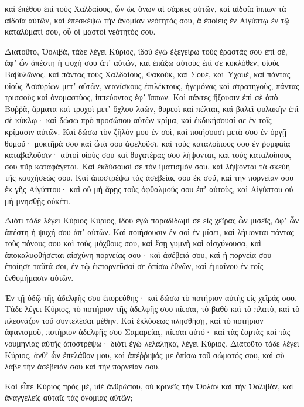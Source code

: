 {καὶ ἐπέθου ἐπὶ τοὺς Χαλδαίους, ὧν ὡς ὄνων αἱ σάρκες αὐτῶν, καὶ αἰδοῖα ἵππων τὰ αἰδοῖα αὐτῶν,
καὶ ἐπεσκέψω τὴν ἀνομίαν νεότητός σου, ἃ ἐποίεις ἐν Αἰγύπτῳ ἐν τῷ καταλύματί σου, οὗ οἱ μαστοὶ νεότητός σου.
\par }{\PP {}Διατοῦτο, Ὀολιβὰ, τάδε λέγει Κύριος, ἰδοὺ ἐγὼ ἐξεγείρω τοὺς ἐραστάς σου ἐπὶ σὲ, ἀφʼ ὧν ἀπέστη ἡ ψυχή σου ἀπʼ αὐτῶν, καὶ ἐπάξω αὐτοὺς ἐπὶ σὲ κυκλόθεν,
υἱοὺς Βαβυλῶνος, καὶ πάντας τοὺς Χαλδαίους, Φακοὺκ, καὶ Σουὲ, καὶ Ὑχουὲ, καὶ πάντας υἱοὺς Ἀσσυρίων μετʼ αὐτῶν, νεανίσκους ἐπιλέκτους, ἡγεμόνας καὶ στρατηγοὺς, πάντας τρισσοὺς καὶ ὀνομαστὺος, ἱππεύοντας ἐφʼ ἵππων.
Καὶ πάντες ἥξουσιν ἐπὶ σὲ ἀπὸ Βοῤῥᾶ, ἅρματα καὶ τροχοὶ μετʼ ὄχλου λαῶν, θυρεοὶ καὶ πέλται, καὶ βαλεῖ φυλακὴν ἐπὶ σὲ κύκλῳ·
καὶ δώσω πρὸ προσώπου αὐτῶν κρίμα, καὶ ἐκδικήσουσί σε ἐν τοῖς κρίμασιν αὐτῶν. Καὶ δώσω τὸν ζῆλόν μου ἐν σοὶ, καὶ ποιήσουσι μετὰ σου ἐν ὀργῇ θυμοῦ· μυκτῆρά σου καὶ ὦτά σου ἀφελοῦσι, καὶ τοὺς καταλοίπους σου ἐν ῥομφαίᾳ καταβαλοῦσιν· αὐτοὶ υἱούς σου καὶ θυγατέρας σου λήψονται, καὶ τοὺς καταλοίπους σου πῦρ καταφάγεται.
Καὶ ἐκδύσουσί σε τὸν ἱματισμόν σου, καὶ λήψονται τὰ σκεύη τῆς καυχήσεώς σου.
Καὶ ἀποστρέψω τὰς ἀσεβείας σου ἐκ σοῦ, καὶ τὴν πορνείαν σου ἐκ γῆς Αἰγύπτου· καὶ οὐ μὴ ἄρῃς τοὺς ὀφθαλμούς σου ἐπʼ αὐτοὺς, καὶ Αἰγύπτου οὐ μὴ μνησθῇς οὐκέτι.
\par }{\PP {}Διότι τάδε λέγει Κύριος Κύριος, ἰδοὺ ἐγὼ παραδίδωμί σε εἰς χεῖρας ὧν μισεῖς, ἀφʼ ὧν ἀπέστη ἡ ψυχή σου ἀπʼ αὐτῶν.
Καὶ ποιήσουσιν ἐν σοὶ ἑν μίσει, καὶ λήψονται πάντας τοὺς πόνους σου καὶ τοὺς μόχθους σου, καὶ ἔσῃ γυμνὴ καὶ αἰσχύνουσα, καὶ ἀποκαλυφθήσεται αἰσχύνη πορνείας σου· καὶ ἀσέβειά σου, καὶ ἡ πορνεία σου
ἐποίησε ταῦτά σοι, ἐν τῷ ἐκπορνεῦσαί σε ὀπίσω ἐθνῶν, καὶ ἐμιαίνου ἐν τοῖς ἐνθυμήμασιν αὐτῶν.
\par }{\PP {}Ἐν τῇ ὁδῷ τῆς ἀδελφῆς σου ἐπορεύθης· καὶ δώσω τὸ ποτήριον αὐτὴς εἰς χεῖράς σου.
Τάδε λέγει Κύριος, τὸ ποτήριον τῆς ἀδελφῆς σου πίεσαι, τὸ βαθὺ καὶ τὸ πλατὺ, καὶ τὸ πλεονάζον τοῦ συντελέσαι μέθην.
Καὶ ἐκλύσεως πλησθήσῃ, καὶ τὸ ποτήριον ἀφανισμοῦ, ποτήριον ἀδελφῆς σου Σαμαρείας, πίεσαι αὐτό·
καὶ τὰς ἑορτὰς καὶ τὰς νουμηνίας αὐτῆς ἀποστρέψω· διότι ἐγὼ λελάληκα, λέγει Κύριος.
Διατοῦτο τάδε λέγει Κύριος, ἀνθʼ ὧν ἐπελάθον μου, καὶ ἀπέῤῥιψάς με ὀπίσω τοῦ σώματός σου, καὶ σὺ λάβε τὴν ἀσέβειάν σου καὶ τὴν πορνείαν σου.
\par }{\PP {}Καὶ εἶπε Κύριος πρὸς μὲ, υἱὲ ἀνθρώπου, οὐ κρινεῖς τὴν Ὀολὰν καὶ τὴν Ὀολιβὰν, καὶ ἀναγγελεῖς αὐταῖς τὰς ὀνομίας αὐτῶν;
}
